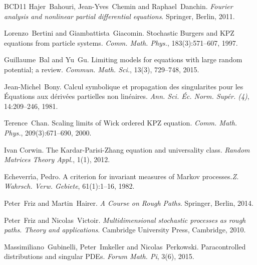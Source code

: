 \documentclass[a4paper,11pt]{article}
\newcommand{\tmtextit}[1]{{\itshape{#1}}}
\begin{document}
\begin{thebibliography}{BCD11}
  Hajer~Bahouri, Jean-Yves~Chemin  and 
  Raphael~Danchin.{\newblock} \tmtextit{Fourier analysis and nonlinear partial
  differential equations}.{\newblock} Springer, Berlin, 2011.{\newblock}
  
  Lorenzo~Bertini  and 
  Giambattista~Giacomin.{\newblock} Stochastic Burgers and KPZ equations from
  particle systems.{\newblock} \tmtextit{Comm. Math. Phys.}, 183(3):571--607,
  1997.{\newblock}
  
  Guillaume~Bal  and  Yu~Gu.{\newblock} Limiting
  models for equations with large random potential; a review.{\newblock}
  \tmtextit{Commun. Math. Sci.}, 13(3), 729--748, 2015.{\newblock}
  
  Jean-Michel~Bony.{\newblock} Calcul symbolique et
  propagation des singularites pour les {\'E}quations aux d{\'e}riv{\'e}es partielles non lin{\'e}aires.{\newblock}
  \tmtextit{Ann. Sci. {\'E}c. Norm. Sup{\'e}r. (4)}, 14:209--246,
  1981.{\newblock}
  
  Terence~Chan.{\newblock} Scaling limits of Wick
  ordered KPZ equation.{\newblock} \tmtextit{Comm. Math. Phys.},
  209(3):671--690, 2000.{\newblock}

Ivan Corwin. {\newblock} The {K}ardar-{P}arisi-{Z}hang equation and universality class. {\newblock} \tmtextit{Random Matrices Theory Appl.}, 1(1), 2012.
  
  Echeverr{\'{\i}}a, Pedro.{\newblock}
   A criterion for invariant measures of {M}arkov processes.{\newblock}\tmtextit{Z. Wahrsch. Verw. Gebiete}, 61(1):1--16, 1982.{\newblock}

  Peter~Friz  and  Martin~Hairer.{\newblock} \tmtextit{A
  Course on Rough Paths}.{\newblock} Springer, Berlin, 2014.{\newblock}
  
  Peter~Friz  and  Nicolas~Victoir.{\newblock}
  \tmtextit{Multidimensional stochastic processes as rough paths. Theory and
  applications}.{\newblock} Cambridge University Press, Cambridge, 2010.{\newblock}
  
  Massimiliano~Gubinelli, Peter~Imkeller  and 
  Nicolas~Perkowski.{\newblock} Paracontrolled distributions and singular
  PDEs.{\newblock} \tmtextit{Forum Math. Pi}, 3(6), 2015.{\newblock}
  

\end{thebibliography}
\end{document}
